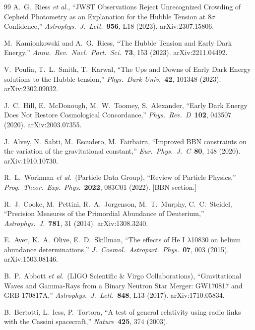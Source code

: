\documentclass[11pt,a4paper]{article}
\theoremstyle{definition}
\begin{document}
\begin{thebibliography}{99}
A.~G.~Riess \emph{et al.}, ``JWST Observations Reject Unrecognized Crowding of Cepheid Photometry as an Explanation for the Hubble Tension at $8\sigma$ Confidence,'' \emph{Astrophys.\ J.\ Lett.}\ \textbf{956}, L18 (2023). arXiv:2307.15806.

M.~Kamionkowski and A.~G.~Riess, ``The Hubble Tension and Early Dark Energy,'' \emph{Annu.\ Rev.\ Nucl.\ Part.\ Sci.}\ \textbf{73}, 153 (2023). arXiv:2211.04492.

V.~Poulin, T.~L.~Smith, T.~Karwal, ``The Ups and Downs of Early Dark Energy solutions to the Hubble tension,'' \emph{Phys.\ Dark Univ.}\ \textbf{42}, 101348 (2023). arXiv:2302.09032.

J.~C.~Hill, E.~McDonough, M.~W.~Toomey, S.~Alexander, ``Early Dark Energy Does Not Restore Cosmological Concordance,'' \emph{Phys.\ Rev.\ D}\ \textbf{102}, 043507 (2020). arXiv:2003.07355.

J.~Alvey, N.~Sabti, M.~Escudero, M.~Fairbairn, ``Improved BBN constraints on the variation of the gravitational constant,'' \emph{Eur.\ Phys.\ J.\ C}\ \textbf{80}, 148 (2020). arXiv:1910.10730.

R.~L.~Workman \emph{et al.}\ (Particle Data Group), ``Review of Particle Physics,'' \emph{Prog.\ Theor.\ Exp.\ Phys.}\ \textbf{2022}, 083C01 (2022). [BBN section.]

R.~J.~Cooke, M.~Pettini, R.~A.~Jorgenson, M.~T.~Murphy, C.~C.~Steidel, ``Precision Measures of the Primordial Abundance of Deuterium,'' \emph{Astrophys.\ J.}\ \textbf{781}, 31 (2014). arXiv:1308.3240.

E.~Aver, K.~A.~Olive, E.~D.~Skillman, ``The effects of He I $\lambda$10830 on helium abundance determinations,'' \emph{J.\ Cosmol.\ Astropart.\ Phys.}\ \textbf{07}, 003 (2015). arXiv:1503.08146.

B.~P.~Abbott \emph{et al.}\ (LIGO Scientific \& Virgo Collaborations), ``Gravitational Waves and Gamma-Rays from a Binary Neutron Star Merger: GW170817 and GRB 170817A,'' \emph{Astrophys.\ J.\ Lett.}\ \textbf{848}, L13 (2017). arXiv:1710.05834.

B.~Bertotti, L.~Iess, P.~Tortora, ``A test of general relativity using radio links with the Cassini spacecraft,'' \emph{Nature}\ \textbf{425}, 374 (2003).


\end{thebibliography}
\end{document}
